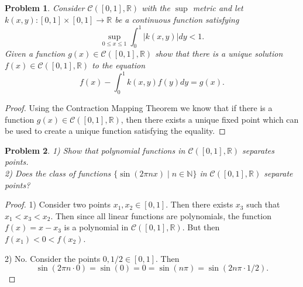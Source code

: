 \documentclass{article}
\newtheorem{problem}{Problem}
\begin{document}
\begin{flushleft}
\begin{problem}
Consider $\mathcal{C} ([0,1], \mathbb{R})$ with the $\sup$ metric and let $k (x,y) : [0,1] \times [0,1] \rightarrow \mathbb{R}$ be a continuous function satisfying
\[
\sup_{0 \leq x \leq 1} \int_0^1 |k(x,y)| dy < 1.
\]
Given a function $g(x) \in \mathcal{C} ([0,1], \mathbb{R})$ show that there is a unique solution $f(x) \in \mathcal{C} ([0,1], \mathbb{R})$ to the equation
\[
f(x) - \int_0^1 k(x,y) f(y) dy = g(x).
\]
\end{problem}
\begin{proof}
Using the Contraction Mapping Theorem we know that if there is a function $g(x) \in \mathcal{C} ([0,1], \mathbb{R})$, then there exists a unique fixed point which can be used to create a unique function satisfying the equality.
\end{proof}

\begin{problem}
1) Show that polynomial functions in $\mathcal{C} ([0,1], \mathbb{R})$ separates points.\\
2) Does the class of functions $\{\sin (2 \pi n x) \mid n \in \mathbb{N} \}$ in $\mathcal{C} ([0,1], \mathbb{R})$ separate points?
\end{problem}
\begin{proof}
1) Consider two points $x_1, x_2 \in [0, 1]$. Then there exists $x_3$ such that $x_1 < x_3 < x_2$. Then since all linear functions are polynomials, the function $f(x) = x - x_3$ is a polynomial in $\mathcal{C} ([0,1], \mathbb{R})$. But then $f(x_1) < 0 < f(x_2)$.\newline

2) No. Consider the points $0, 1/2 \in [0, 1]$. Then
\[
\sin (2 \pi n \cdot 0) = \sin(0) = 0 = \sin (n \pi) = \sin (2 n \pi \cdot 1/2).
\]
\end{proof}


\end{flushleft}
\end{document}
